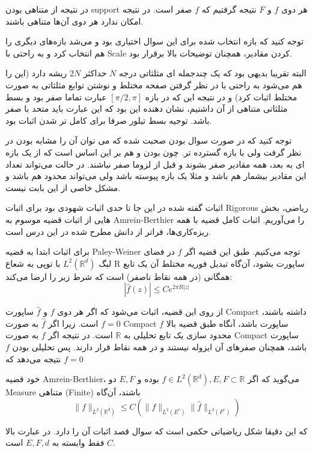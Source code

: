\documentclass[12pt]{article}
\begin{document}
 در نتیجه از متناهی بودن support هر دوی $f$ و $F$ نتیجه گرفتیم که $f$ صفر است. در نتیجه امکان ندارد هر دوی آن‌ها متناهی باشند.
 
 توجه کنید که بازه انتخاب شده برای این سوال اختیاری بود و می‌شد بازه‌های دیگری را هم انتخاب کرد و به راحتی با Scale کردن مقادیر، همچنان توضیحات بالا برقرار بود.
 
 
 البته تقریبا بدیهی بود که یک چندجمله ای مثلثاتی درجه $N$ حداکثر $2N$ ریشه دارد (این را هم می‌شود به راحتی با در نظر گرفتن صفحه مختلط و نوشتن توابع مثلثاتی به صورت مختلط اثبات کرد) و در نتیجه این که در بازه
 $[\pi/2 , \pi]$
 عبارت تماما صفر بود و بسط مثلثاتی متناهی از آن داشتیم،‌ نشان دهنده این بود که این عبارت باید متحد با صفر باشد. توجیه بسط تیلور صرفا برای کامل تر شدن اثبات بود.
 
 
 توجه کنید که در صورت سوال  بودن صحبت شده که می توان آن را مشابه  بودن در نظر گرفت ولی با بازه گسترده تر. چون  بودن و  هم بر این اساس است که از یک بازه ای به بعد، همه مقادیر صفر بشوند و قبل از لزوما صفر نباشند. در حالت  می‌تواند تعداد این مقادیر بیشمار هم باشد و مثلا یک بازه پیوسته باشد ولی می‌تواند محدود هم باشد و مشکل خاصی از این بابت نیست.
 
 
 اثبات گفته شده در این جا تا حدی اثبات شهودی بود برای اثبات Rigorous ریاضی، بخش هایی از اثبات قضیه موسوم به Amrein-Berthier را می‌آوریم. اثبات کامل قضیه با همه ریزه‌کاری‌ها، فراتر از دانش مطرح شده در این درس است.
 
 برای اثبات ابتدا به قضیه Paley-Weiner توجه می‌کنیم. طبق این قضیه اگر $f$ در فضای لبگ 
 $L^2(\mathbb{R}^d)$
 با توپی به شعاع R ساپورت بشود، آن‌گاه تبدیل فوریه مختلط آن یک تابع همگانی (در همه نقاط ناصفر) است که شرط زیر را ارضا می‌کند:
 $$
 |\hat{f}(z)| \leqslant C e^{2 \pi R|z|}
 $$
 
 از روی این قضیه، اثبات می‌شود که اگر هر دوی $f$ و $\hat{f}$ ساپورت Compact داشته باشند، $f=0$ است. زیرا اگر $\hat{f}$ به صورت Compact ساپورت باشد، آنگاه طبق قضیه بالا $f$ محدود سازی یک تابع تحلیلی به $\mathbb{R}$ است. در نتیجه اگر $f$ به صورت Compact ساپورت باشد، همچنان صفر‌های آن ایزوله نیستند و در همه نقاط قرار دارند. پس تحلیلی بودن $f$ نتیجه می‌دهد که $f=0$
 
 خود قضیه Amrein-Berthier، می‌گوید که اگر
 $f \in L^2(\mathbb{R}^d), E,F \subset \mathbb{R}$
 بوده و $E,F$ دو Measure متناهی (Finite) باشند، آن‌گاه
 $$
 \|f\|_{L^{2}\left(\mathbb{R}^{d}\right)} \leqslant C\left(\|f\|_{L^{2}\left(E^{c}\right)}\|\hat{f}\|_{L^{2}\left(F^{c}\right)}\right)
 $$
 
 که این دقیقا شکل ریاضیاتی حکمی است که سوال قصد اثبات آن را دارد. در عبارت بالا $C$ فقط وابسته به $E,F,d$ است.
 
\end{document}
